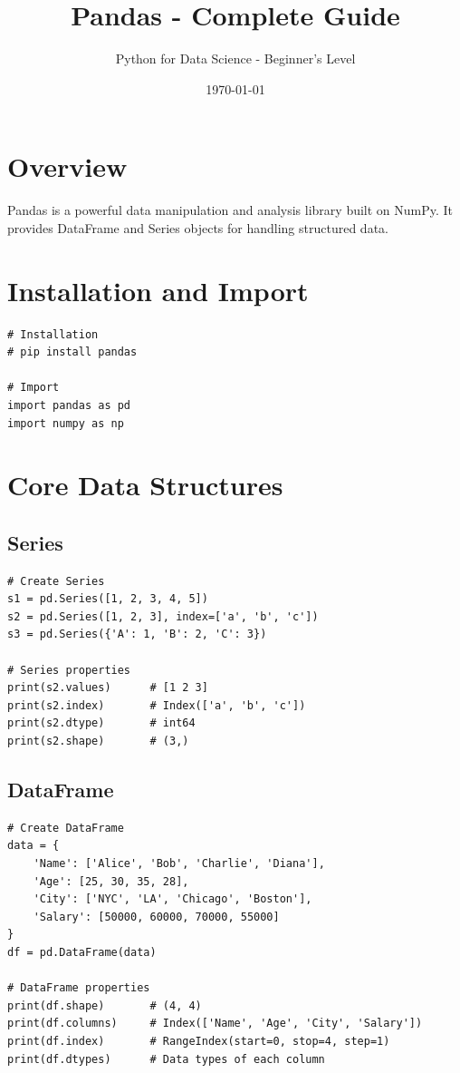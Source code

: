 \documentclass[12pt,a4paper]{article}
\title{\textbf{Pandas - Complete Guide}}
\author{Python for Data Science - Beginner's Level}
\date{\today}
\begin{document}
\maketitle
\tableofcontents
\newpage

\section{Overview}

Pandas is a powerful data manipulation and analysis library built on NumPy. It provides DataFrame and Series objects for handling structured data.

\section{Installation and Import}

\begin{lstlisting}
# Installation
# pip install pandas

# Import
import pandas as pd
import numpy as np
\end{lstlisting}

\section{Core Data Structures}

\subsection{Series}

\begin{lstlisting}
# Create Series
s1 = pd.Series([1, 2, 3, 4, 5])
s2 = pd.Series([1, 2, 3], index=['a', 'b', 'c'])
s3 = pd.Series({'A': 1, 'B': 2, 'C': 3})

# Series properties
print(s2.values)      # [1 2 3]
print(s2.index)       # Index(['a', 'b', 'c'])
print(s2.dtype)       # int64
print(s2.shape)       # (3,)
\end{lstlisting}

\subsection{DataFrame}

\begin{lstlisting}
# Create DataFrame
data = {
    'Name': ['Alice', 'Bob', 'Charlie', 'Diana'],
    'Age': [25, 30, 35, 28],
    'City': ['NYC', 'LA', 'Chicago', 'Boston'],
    'Salary': [50000, 60000, 70000, 55000]
}
df = pd.DataFrame(data)

# DataFrame properties
print(df.shape)       # (4, 4)
print(df.columns)     # Index(['Name', 'Age', 'City', 'Salary'])
print(df.index)       # RangeIndex(start=0, stop=4, step=1)
print(df.dtypes)      # Data types of each column
\end{lstlisting}
\end{document}
